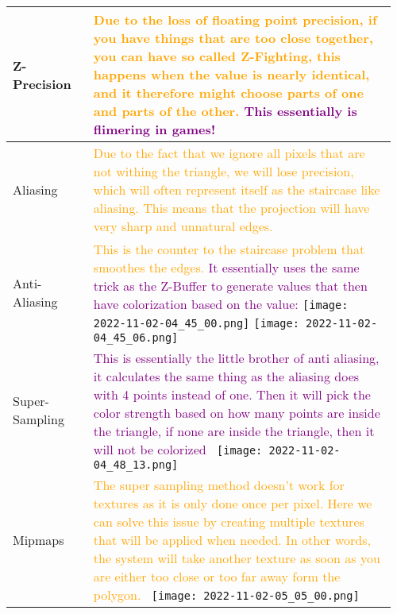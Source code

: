 \documentclass[main.tex,fontsize=8pt,paper=a4,paper=portrait,DIV=calc,]{scrartcl}
\begin{document}
\begin{table}[ht!]
\begin{tabular}{|m{0.2\linewidth}|m{0.755\linewidth}|}
\hline
Z-Precision & 
\textcolor{orange}{Due to the loss of floating point precision, if you have things that are too close together, you can have so called \textbf{Z-Fighting}, this happens when the value is nearly identical, and it therefore might choose parts of one and parts of the other.}\newline
\textcolor{purple}{This essentially is flimering in games!}\\
\hline
Aliasing & 
\textcolor{orange}{Due to the fact that we ignore all pixels that are not withing the triangle, we will lose precision, which will often represent itself as the staircase like aliasing. This means that the projection will have very sharp and unnatural edges.}\\
\hline
Anti-Aliasing & 
\textcolor{orange}{This is the counter to the staircase problem that smoothes the edges.}\newline
\textcolor{purple}{It essentially uses the same trick as the Z-Buffer to generate values that then have colorization based on the value:}\newline
\texttt{[image: 2022-11-02-04\_45\_00.png]} \texttt{[image: 2022-11-02-04\_45\_06.png]}\\
\hline
Super-Sampling & 
\textcolor{purple}{This is essentially the little brother of anti aliasing, it calculates the same thing as the aliasing does with 4 points instead of one.\newline
Then it will pick the color strength based on how many points are inside the triangle, if none are inside the triangle, then it will not be colorized}\newline
\, \newline
\texttt{[image: 2022-11-02-04\_48\_13.png]}\\
\hline
Mipmaps & 
\textcolor{orange}{The super sampling method doesn't work for textures as it is only done once per pixel.\newline
Here we can solve this issue by creating multiple textures that will be applied when needed.\newline
In other words, the system will take another texture as soon as you are either too close or too far away form the polygon.}\newline
\, \newline
\texttt{[image: 2022-11-02-05\_05\_00.png]}\\
\hline
\end{tabular}

\end{table}
\end{document}
